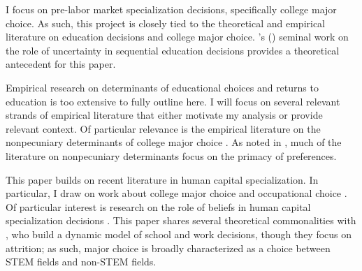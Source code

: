 \documentclass[11 pt]{article}
\newcommand{\toedit}[1]{{\color{gray}#1}}
\newcommand{\toedit}[1]{#1}
\newcommand{\citeposs}[1]{{\citeauthor{#1}'s (\citeyear{#1})}}
\begin{document}
I focus on pre-labor market specialization decisions, specifically college major choice. 
As such, this project is closely tied to the theoretical and empirical literature on education decisions and college major choice.
\citeposs{A93} seminal work on the role of uncertainty in sequential education decisions provides a theoretical antecedent for this paper. 

Empirical research on determinants of educational choices and returns to education is too extensive to fully outline here.
I will focus on several relevant strands of empirical literature that either motivate my analysis or provide relevant context. 
Of particular relevance is the empirical literature on the nonpecuniary determinants of college major choice \parencite{A04,WZ18,Z13}.
As noted in \toedit{\textcite{Z13}}, much of the literature on nonpecuniary determinants focus on the primacy of preferences. 







This paper builds on recent literature in human capital specialization.
In particular, I draw on work about college major choice and occupational choice \parencite{ABM12,AAM16-education}.
Of particular interest is research on the role of beliefs in human capital specialization decisions \parencite{AHMR-wp}.
This paper shares several theoretical commonalities with \textcite{AAMR16-wp}, who build a dynamic model of school and work decisions, though they focus on attrition; as such, major choice is broadly characterized as a choice between STEM fields and non-STEM fields. 
\end{document}
